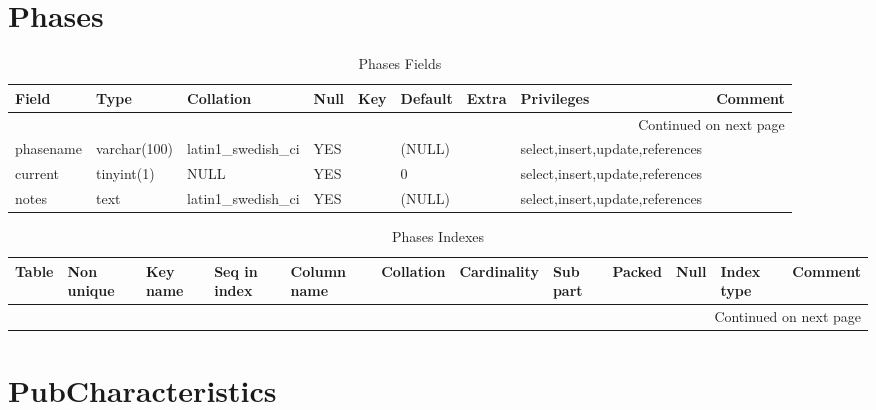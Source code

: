 \documentclass[tablesignature,landscape]{scrartcl}
\begin{document}
\section{Phases}
\label{sec-16}


\begin{longtable}{|l|l|l|l|l|l|l|l|l|}
\caption{Phases Fields} \label{tbl:phasesfields}\\
\hline
 Field      &  Type          &  Collation                &  Null  &  Key  &  Default  &  Extra              &  Privileges                       &  Comment \\
\hline
\endhead
\hline\multicolumn{9}{r}{Continued on next page}\
\endfoot
\endlastfoot
\hline
 phaseid    &  int(11)       &  NULL                     &        &  PRI  &  (NULL)   &  auto\_{}increment  &  select,insert,update,references  &           \\
 phasename  &  varchar(100)  &  latin1\_{}swedish\_{}ci  &  YES   &       &  (NULL)   &                     &  select,insert,update,references  &           \\
 current    &  tinyint(1)    &  NULL                     &  YES   &       &  0        &                     &  select,insert,update,references  &           \\
 notes      &  text          &  latin1\_{}swedish\_{}ci  &  YES   &       &  (NULL)   &                     &  select,insert,update,references  &           \\
\hline
\end{longtable}


\begin{longtable}{|l|l|l|l|l|l|l|l|l|l|l|l|}
\caption{Phases Indexes} \label{tbl:phasesindexes}\\
\hline
 Table   &  Non unique  &  Key name  &  Seq in index  &  Column name  &  Collation  &  Cardinality  &  Sub part  &  Packed  &  Null  &  Index type  &  Comment \\
\hline
\endhead
\hline\multicolumn{12}{r}{Continued on next page}\
\endfoot
\endlastfoot
\hline
 Phases  &           0  &  PRIMARY   &             1  &  phaseid      &  A          &            4  &  (NULL)    &  (NULL)  &        &  BTREE       &           \\
\hline
\end{longtable}
\section{PubCharacteristics}
\label{sec-17}
\end{document}
